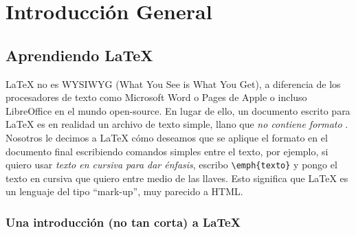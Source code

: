 
\chapter{Introducción General} %

\label{Chapter1} %
\label{IntroGeneral}


\newcommand{\keyword}[1]{\textbf{#1}}
\newcommand{\tabhead}[1]{\textbf{#1}}
\newcommand{\code}[1]{\texttt{#1}}
\newcommand{\file}[1]{\texttt{\bfseries#1}}
\newcommand{\option}[1]{\texttt{\itshape#1}}
\newcommand{\grados}{$^{\circ}$}



\section{Aprendiendo \LaTeX{}}

\LaTeX{} no es \textsc{WYSIWYG} (What You See is What You Get), a diferencia de los procesadores de texto como Microsoft Word o Pages de Apple o incluso LibreOffice en el mundo open-source. En lugar de ello, un documento escrito para \LaTeX{} es en realidad un archivo de texto simple, llano que \emph{no contiene formato} . Nosotros le decimos a \LaTeX{} cómo deseamos que se aplique el formato en el documento final escribiendo comandos simples entre el texto, por ejemplo, si quiero usar \emph{texto en cursiva para dar énfasis}, escribo \verb|\emph{texto}| y pongo el texto en cursiva que quiero entre medio de las llaves. Esto significa que \LaTeX{} es un lenguaje del tipo \enquote{mark-up}, muy parecido a HTML.

\subsection{Una introducción (no tan corta) a \LaTeX{}}

